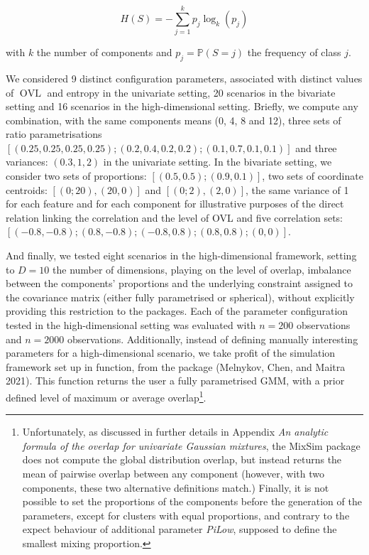 \begin{equation}
    H(S)=-\sum_{j=1}^k p_j \log_k (p_j)
\label{eq:entropy}
\end{equation}

with \(k\) the number of components and \(p_j=\mathbb{P}(S=j)\) the frequency of class \(j\).

We considered 9 distinct configuration parameters, associated with distinct values of \(\operatorname{OVL}\) and entropy in the univariate setting, 20 scenarios in the bivariate setting and 16 scenarios in the high-dimensional setting. Briefly, we compute any combination, with the same components means (0, 4, 8 and 12), three sets of ratio parametrisations \(\left[(0.25, 0.25, 0.25, 0.25); (0.2, 0.4, 0.2, 0.2); (0.1, 0.7, 0.1, 0.1) \right]\) and three variances: \((0.3, 1, 2)\) in the univariate setting. In the bivariate setting, we consider two sets of proportions: \(\left[(0.5, 0.5); (0.9, 0.1) \right]\), two sets of coordinate centroids: \(\left[(0; 20), (20, 0) \right]\) and \(\left[(0; 2), (2, 0) \right]\), the same variance of 1 for each feature and for each component for illustrative purposes of the direct relation linking the correlation and the level of OVL and five correlation sets:\([(-0.8, -0.8); (0.8, -0.8);\allowbreak (-0.8, 0.8); (0.8, 0.8); (0, 0)]\).

And finally, we tested eight scenarios in the high-dimensional framework, setting to \(D=10\) the number of dimensions, playing on the level of overlap, imbalance between the components' proportions and the underlying constraint assigned to the covariance matrix (either fully parametrised or spherical), without explicitly providing this restriction to the packages. Each of the parameter configuration tested in the high-dimensional setting was evaluated with \(n=200\) observations and \(n=2000\) observations. Additionally, instead of defining manually interesting parameters for a high-dimensional scenario, we take profit of the simulation framework set up in  function, from the  package (Melnykov, Chen, and Maitra 2021). This function returns the user a fully parametrised GMM, with a prior defined level of maximum or average overlap\footnote{Unfortunately, as discussed in further details in Appendix \emph{An analytic formula of the overlap for univariate Gaussian mixtures}, the MixSim package does not compute the global distribution overlap, but instead returns the mean of pairwise overlap between any component (however, with two components, these two alternative definitions match.) Finally, it is not possible to set the proportions of the components before the generation of the parameters, except for clusters with equal proportions, and contrary to the expect behaviour of additional parameter \emph{PiLow}, supposed to define the smallest mixing proportion.}.

